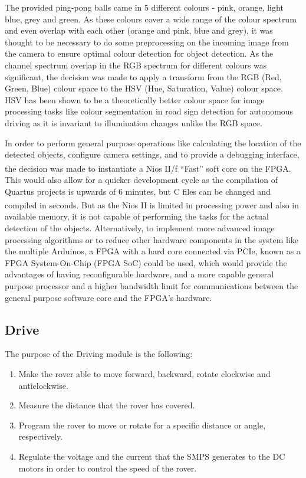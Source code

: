 \documentclass[a4paper]{article}
\begin{document}
The provided ping-pong balls came in 5 different colours - pink, orange, light 
blue, grey and green. As these colours cover a wide range of the colour spectrum
and even overlap with each other (orange and pink, blue and grey), it was thought 
to be necessary to do some preprocessing on the incoming image from the camera 
to ensure optimal colour detection for object detection.  
As the channel spectrum overlap in the RGB spectrum for different colours was significant, the decision was made to apply
a transform from the RGB (Red, Green, Blue) colour space to the HSV (Hue, 
Saturation, Value) colour space.  HSV has been shown to be a theoretically better colour space
for image processing tasks like colour segmentation in road sign detection for 
autonomous driving as it is invariant to illumination changes unlike the RGB 
space.\cite{ali2013performance} 

In order to perform general purpose operations like
    calculating the location of the detected objects,
    configure camera settings,
    and to provide a debugging interface,
the decision was made to instantiate a Nios\textsuperscript{\textregistered} II/f ``Fast'' soft core on the FPGA. 
This would also allow for a quicker development cycle as the compilation of Quartus projects
is upwards of 6 minutes, but C files can be changed and compiled in seconds. But as the Nios\textsuperscript{\textregistered} II 
is limited in processing power and also in available memory, it is not capable of performing 
the tasks for the actual detection of the objects.  
Alternatively, to implement more advanced image processing algorithms
or to reduce other hardware components in the system like the multiple Arduinos, 
a FPGA with a hard core connected via PCIe, 
known as a FPGA System-On-Chip (FPGA SoC) \cite{FPGASoC} could be used, 
which would provide the advantages of having reconfigurable hardware, and
a more capable general purpose processor and a higher bandwidth limit for communications
between the general purpose software core and the FPGA's hardware. 




\subsection{Drive}
The purpose of the Driving module is the following:
\begin{enumerate}
  \item Make the rover able to move forward, backward, rotate clockwise and anticlockwise.
  \item Measure the distance that the rover has covered. 
  \item Program the rover to move or rotate for a specific distance or angle, respectively.
  \item Regulate the voltage and the current that the SMPS generates to the DC motors in order to control the speed of the rover.
\end{enumerate}
\end{document}

